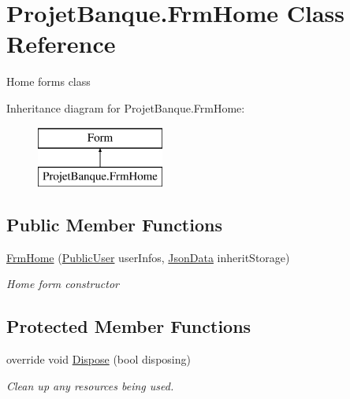 \hypertarget{class_projet_banque_1_1_frm_home}{}\section{Projet\+Banque.\+Frm\+Home Class Reference}
\label{class_projet_banque_1_1_frm_home}


Home form\textquotesingle{}s class  


Inheritance diagram for Projet\+Banque.\+Frm\+Home\+:\begin{figure}[H]
\begin{center}
\leavevmode
\includegraphics[height=2.000000cm]{class_projet_banque_1_1_frm_home}
\end{center}
\end{figure}
\subsection*{Public Member Functions}
\begin{DoxyCompactItemize}
\item 
\mbox{\hyperlink{class_projet_banque_1_1_frm_home_a737fa29ecf98ef35e4675e3288ab7555}{Frm\+Home}} (\mbox{\hyperlink{class_projet_banque_1_1_public_user}{Public\+User}} user\+Infos, \mbox{\hyperlink{class_projet_banque_1_1_json_data}{Json\+Data}} inherit\+Storage)
\begin{DoxyCompactList}\small\item\em Home form constructor \end{DoxyCompactList}\end{DoxyCompactItemize}
\subsection*{Protected Member Functions}
\begin{DoxyCompactItemize}
\item 
override void \mbox{\hyperlink{class_projet_banque_1_1_frm_home_aa803b45ae773dfb9f1abe667c6b4de06}{Dispose}} (bool disposing)
\begin{DoxyCompactList}\small\item\em Clean up any resources being used. \end{DoxyCompactList}\end{DoxyCompactItemize}


